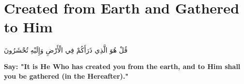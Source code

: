 \chapter{Created from Earth and Gathered to Him}
\begin{center}
    {\Huge    
        \begin{Arabic}
            قُلْ هُوَ الَّذِي ذَرَأَكُمْ فِي الْأَرْضِ وَإِلَيْهِ تُحْشَرُونَ
        \end{Arabic}
    }
\end{center}
\vspace*{\fill}
\vspace{3cm}
\begin{center}
    \large \textbf{Say: "It is He Who has created you from the earth, and to Him shall you be gathered (in the Hereafter)."}
\end{center}
